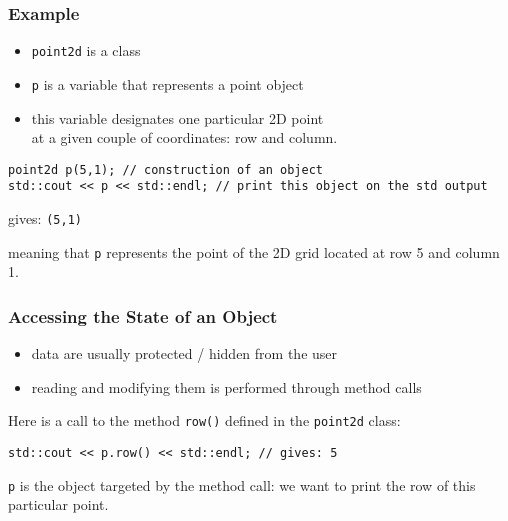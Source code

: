 \documentclass{beamer}
\newcommand{\code}[1]{{\scriptsize{\texttt{#1}}}\xspace}
\newcommand{\var}[1]{\texttt{#1}\xspace}
\newcommand{\pointIId}{\code{point2d}}
\begin{document}
\begin{frame}[fragile]
  \frametitle{Example}

  \begin{itemize}
  \item \pointIId is a class
  \item \var{p} is a variable that represents a point object
  \item this variable designates one particular 2D point\\
    at a given couple of coordinates: row and column.
  \end{itemize}

\smallskip

\begin{lstlisting}
point2d p(5,1); // construction of an object
std::cout << p << std::endl; // print this object on the std output
\end{lstlisting} %

gives: \code{(5,1)}

meaning that \var{p} represents the point of the 2D grid located at
row 5 and column 1.

\end{frame}



\begin{frame}[fragile]
  \frametitle{Accessing the State of an Object}

  \begin{itemize}
  \item data are usually protected / hidden from the user
  \item reading and modifying them is performed through method calls
  \end{itemize}

\smallskip

Here is a call to the method  \code{row()} defined in the \pointIId class:

\begin{lstlisting}
std::cout << p.row() << std::endl; // gives: 5
\end{lstlisting} %

\var{p} is the object targeted by the method call: we want to print
the row of this particular point.

\end{frame}
\end{document}
